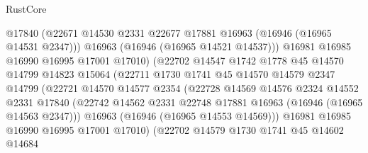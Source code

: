 \begin{lexlean}{RustCore}
\begin{coremodule}
                              @17840
                              (@22671
                                @14530
                                @2331
                                @22677
                                @17881
                                @16963
                                (@16946 (@16965 @14531 @2347)))
                              @16963
                              (@16946 (@16965 @14521 @14537)))
                            @16981
                            @16985
                            @16990
                            @16995
                            @17001
                            @17010)
                          (@22702
                            @14547
                            @1742
                            @1778
                            @45
                            @14570
                            @14799
                            @14823
                            @15064
                            (@22711
                              @1730
                              @1741
                              @45
                              @14570
                              @14579
                              @2347
                              @14799
                              (@22721
                                @14570
                                @14577
                                @2354
                                (@22728
                                  @14569
                                  @14576
                                  @2324
                                  @14552
                                  @2331
                                  @17840
                                  (@22742
                                    @14562
                                    @2331
                                    @22748
                                    @17881
                                    @16963
                                    (@16946 (@16965 @14563 @2347)))
                                  @16963
                                  (@16946 (@16965 @14553 @14569)))
                                @16981
                                @16985
                                @16990
                                @16995
                                @17001
                                @17010)
                              (@22702
                                @14579
                                @1730
                                @1741
                                @45
                                @14602
                                @14684

\end{coremodule}
\end{lexlean}
